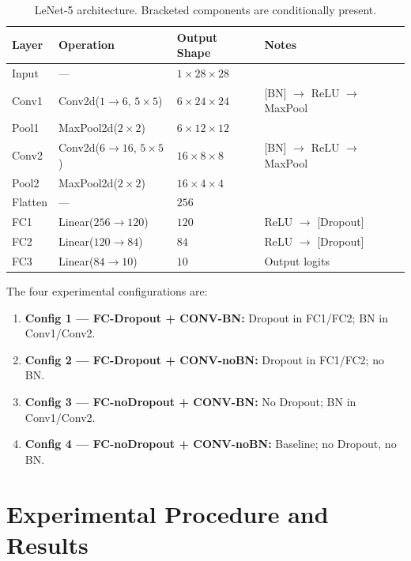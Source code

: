 \documentclass[11pt]{article}
\begin{document}
\begin{table}[H]
  \centering
  \begin{tabular}{llll}
    \toprule
    \textbf{Layer} & \textbf{Operation} & \textbf{Output Shape} & \textbf{Notes} \\
    \midrule
    Input  & ---                         & $1\times28\times28$ & \\
    Conv1  & Conv2d($1{\to}6$, $5\times5$) & $6\times24\times24$ & [BN] $\to$ ReLU $\to$ MaxPool \\
    Pool1  & MaxPool2d($2\times2$)         & $6\times12\times12$ & \\
    Conv2  & Conv2d($6{\to}16$, $5\times5$)& $16\times8\times8$  & [BN] $\to$ ReLU $\to$ MaxPool \\
    Pool2  & MaxPool2d($2\times2$)         & $16\times4\times4$  & \\
    Flatten& ---                         & $256$               & \\
    FC1    & Linear($256{\to}120$)        & $120$               & ReLU $\to$ [Dropout] \\
    FC2    & Linear($120{\to}84$)         & $84$                & ReLU $\to$ [Dropout] \\
    FC3    & Linear($84{\to}10$)          & $10$                & Output logits \\
    \bottomrule
  \end{tabular}
  \caption{LeNet-5 architecture. Bracketed components are conditionally present.}
\end{table}

The four experimental configurations are:

\begin{enumerate}
  \item \textbf{Config 1 --- FC-Dropout + CONV-BN:} Dropout in FC1/FC2; BN in Conv1/Conv2.
  \item \textbf{Config 2 --- FC-Dropout + CONV-noBN:} Dropout in FC1/FC2; no BN.
  \item \textbf{Config 3 --- FC-noDropout + CONV-BN:} No Dropout; BN in Conv1/Conv2.
  \item \textbf{Config 4 --- FC-noDropout + CONV-noBN:} Baseline; no Dropout, no BN.
\end{enumerate}

\section{Experimental Procedure and Results}
\end{document}
